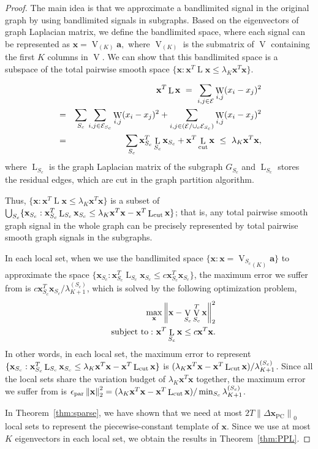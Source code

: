\documentclass[journal,twocolumn,10pt]{IEEEtran}
\theoremstyle{definition}
\def\a{\mathbf{a}}
\def\x{\mathbf{x}}
\def\E{\mathcal{E}}
\DeclareMathOperator{\LL}{L}
\DeclareMathOperator{\PC}{PC}
\DeclareMathOperator{\Vm}{V}
\DeclareMathOperator{\W}{W}
\begin{document}
\begin{proof}
The main idea is that we approximate a bandlimited signal in the original graph by using bandlimited signals in subgraphs. Based on the eigenvectors of graph Laplacian matrix, we define the bandlimited space, where each signal can be represented as $\x = \Vm_{(K)} \a,$ where $\Vm_{(K)}$ is the submatrix of $\Vm$ containing the first $K$ columns in $\Vm$. We can show that this bandlimited space is a subspace of the total pairwise smooth space $\{\x: \x^T \LL \x \leq  \lambda_K  \x^T \x \}$. 

\begin{eqnarray*}
&& \x^T \LL \x 
\  = \  \sum_{i,j \in \E} \W_{i,j} (x_i - x_j)^2
\\
& = & \sum_{S_c} \sum_{i,j \in \E_{S_c}} \W_{i,j} (x_i - x_j)^2  + \sum_{i,j \in (\E / \cup_{c} \E_{S_c}) } \W_{i,j} (x_i - x_j)^2
\\
& = &  \sum_{S_c} \x_{S_c}^T \LL_{S_c} \x_{S_c} + \x^T \LL_{\rm cut} \x \ \leq \    \lambda_K  \x^T \x,
\end{eqnarray*}
where $\LL_{S_c}$ is the graph Laplacian matrix of the subgraph $G_{S_c}$ and  $\LL_{S_c}$ stores the residual edges, which are cut in the graph partition algorithm.


Thus, $\{\x: \x^T \LL \x \leq  \lambda_K  \x^T \x \}$ is a subset of $\bigcup_{S_c}  \{\x_{S_c}: \x_{S_c}^T \LL_{S_c} \x_{S_c} \leq  \lambda_K  \x^T \x - \x^T \LL_{\rm cut} \x  \}$; that is, any  total pairwise smooth graph signal in the whole graph can be precisely represented by total pairwise smooth graph signals in the subgraphs.

In each local set, when we use the bandlimited space 
$\{ \x: \x = {\Vm_{S_c}}_{(K)} \a \}$ to approximate the space $\{\x_{S_c}: \x_{S_c}^T \LL_{S_c} \x_{S_c} \leq   c \x_{S_c}^T \x_{S_c} \}$, the maximum error we suffer from is $c \x_{S_c}^T \x_{S_c} / \lambda^{(S_c)}_{K+1}$, which is solved by the following optimization problem,
\begin{eqnarray*}
&&	\max_{\x}  \left\|  \x - \Vm_{S_c} \Vm_{S_c}^T \x \right\|_2^2
	\\
&&	{\rm subject~to:}~   \x^T \LL_{S_c} \x \leq   c  \x^T \x.
\end{eqnarray*}
In other words, in each local set, the maximum error to represent $ \{\x_{S_c}: \x_{S_c}^T \LL_{S_c} \x_{S_c} \leq  \lambda_K  \x^T \x - \x^T \LL_{\rm cut} \x   \}$ is 
$(\lambda_K  \x^T \x - \x^T \LL_{\rm cut} \x)/\lambda^{(S_c)}_{K+1}$. Since all the local sets share the variation budget of $\lambda_K \x^T \x$ together, the maximum error we suffer from is $\epsilon_{\rm par} \left\| \x \right\|_2^2 = (\lambda_K  \x^T \x - \x^T \LL_{\rm cut} \x)/ \min_{S_c} \lambda^{(S_c)}_{K+1}$.



In Theorem~\ref{thm:sparse}, we have shown that we need at most $2 T \left\| \Delta \x_{\PC} \right\|_0$ local sets to represent the piecewise-constant template of $\x$. Since we use at most $K$ eigenvectors in each local set, we obtain the results in Theorem~\ref{thm:PPL}.
\end{proof}
\end{document}
